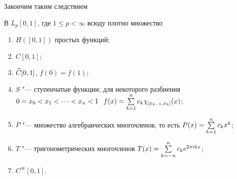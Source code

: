 Закончим таким следствием
\begin{Sl}
  В $L_p[0,1]$, где $1\le p<\infty$ всюду плотно множество
\begin{enumerate}
  \item $H([0,1])$ простых функций;
  \item $C[0,1]$;
  \item $\widetilde{C}{}[0,1]$, $f(0) = f(1)$;
  \item $S$ "--- ступенчатые функции; для некоторого разбиения $0=x_0<x_1<\dots<x_n<1\hskip .75em plus.1em minus.08em\relax f(x) = \sum\limits_{k = 1}^{n} c_k\chi_{[x_{k-1},x_k]}(x)$;
  \item $P$ "--- множество алгебраических многочленов, то есть $P(x) = \sum\limits_{k = 1}^{n} c_k x^k$;
  \item $T$ "--- тригонометрических многочленов $T(x) = \sum\limits_{k = -n}^{n}c_k e^{2\pi i k x}$;
  \item $C^{\infty}[0,1]$.
\end{enumerate}
\end{Sl}
